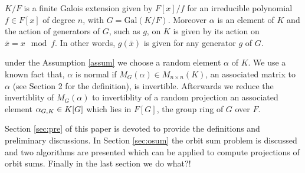 \begin{assumption}\label{assum}
$K/F$ is a finite Galois extension given by $ F[x]/f$ for an irreducible polynomial $f\in F[x]$ of degree $n$, with
 $G = \mathrm{Gal}(K/F)$. Moreover $\alpha$ is an element of $K$ and the action of generators of $ G$, such as $g$, on $K$ is given by its action on $\bar{x} = x \mod f.$ In other words, $g(\bar{x})$ is given for any generator $g$ of $G$.
\end{assumption}

under the Assumption \ref{assum} we choose a random element $\alpha$ of $K$. We use a known fact that, $\alpha$ is normal 
if $M_G(\alpha) \in M_{n\times n}(K)$, an associated matrix to $\alpha$ (see Section 2 for the definition), is invertible. 
Afterwards we reduce the invertiblity of $M_G(\alpha)$ to invertiblity of a random projection an associated element 
$\alpha_{G,K} \in K[G]$ which lies in $F[G]$, the group ring of $G$ over $F$. 

Section \ref{sec:pre} of this paper is devoted to provide the definitions and preliminary discussions. In Section \ref{sec:osum} 
the orbit sum problem is discussed and two algorithms are presented which can be applied to compute projections of orbit sums.
Finally in the last section we do what?!

